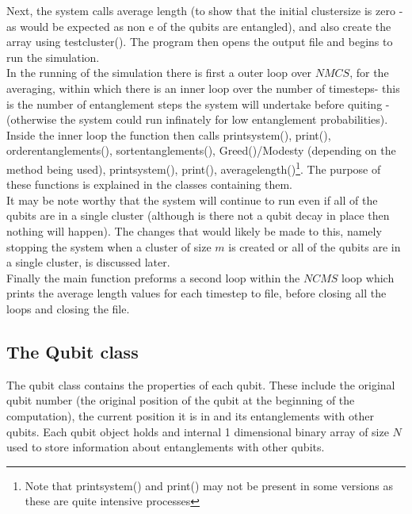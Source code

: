 \documentclass{article}
\numberwithin{equation}{section} %
\begin{document}
Next, the system calls average length (to show that the initial clustersize is zero - as would be expected as non e of the qubits are entangled), and also create the array using testcluster(). The program then opens the output file and begins to run the simulation. \\   

In the running of the simulation there is first a outer loop over $NMCS$, for the averaging, within which there is an inner loop over the number of timesteps- this is the number of entanglement steps the system will undertake before quiting - (otherwise the system could run infinately for low entanglement probabilities). Inside the inner loop the function then calls print\textunderscore system(), print(), order\textunderscore entanglements(), sort\textunderscore entanglements(), Greed()/Modesty (depending on the method being used), print\textunderscore system(), print(), average\textunderscore length()\footnote{Note that print\textunderscore system() and print() may not be present in some versions as these are quite intensive processes}. The purpose of these functions is explained in the classes containing them. \\

It may be note worthy that the system will continue to run even if all of the qubits are in a single cluster (although is there not a qubit decay in place then nothing will happen). The changes that would likely be made to this, namely stopping the system when a cluster of size $m$ is created or all of the qubits are in a single cluster, is discussed later. \\

Finally the main function preforms a second loop within the $NCMS$ loop which prints the average length values for each timestep to  file, before closing all the loops and closing the file. 


\subsection{The Qubit class}
The qubit class contains the properties of each qubit. These include the original qubit number (the original position of the qubit at the beginning of the computation), the current position it is in and its entanglements with other qubits. Each qubit object holds and internal 1 dimensional binary array of size $N$ used to store information about entanglements with other qubits. 
\end{document}
